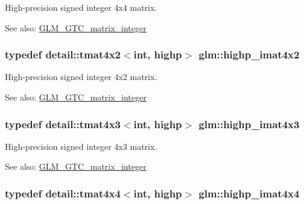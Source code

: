 High-precision signed integer 4x4 matrix. \begin{Desc}
\item[See also:]\hyperlink{group__gtc__matrix__integer}{GLM\_\-GTC\_\-matrix\_\-integer} \end{Desc}
\hypertarget{group__gtc__matrix__integer_gd998dce143f674a95a25241ff6e5e7d2}{
\subsubsection[highp\_\-imat4x2]{\setlength{\rightskip}{0pt plus 5cm}typedef detail::tmat4x2$<$int, highp$>$ {\bf glm::highp\_\-imat4x2}}}
\label{group__gtc__matrix__integer_gd998dce143f674a95a25241ff6e5e7d2}


High-precision signed integer 4x2 matrix. \begin{Desc}
\item[See also:]\hyperlink{group__gtc__matrix__integer}{GLM\_\-GTC\_\-matrix\_\-integer} \end{Desc}
\hypertarget{group__gtc__matrix__integer_g9d51b6f1c8cd0b23c6fcc8dca924b14c}{
\subsubsection[highp\_\-imat4x3]{\setlength{\rightskip}{0pt plus 5cm}typedef detail::tmat4x3$<$int, highp$>$ {\bf glm::highp\_\-imat4x3}}}
\label{group__gtc__matrix__integer_g9d51b6f1c8cd0b23c6fcc8dca924b14c}


High-precision signed integer 4x3 matrix. \begin{Desc}
\item[See also:]\hyperlink{group__gtc__matrix__integer}{GLM\_\-GTC\_\-matrix\_\-integer} \end{Desc}
\hypertarget{group__gtc__matrix__integer_g969c88d5c7530beb80768205a054ee80}{
\subsubsection[highp\_\-imat4x4]{\setlength{\rightskip}{0pt plus 5cm}typedef detail::tmat4x4$<$int, highp$>$ {\bf glm::highp\_\-imat4x4}}}
\label{group__gtc__matrix__integer_g969c88d5c7530beb80768205a054ee80}


